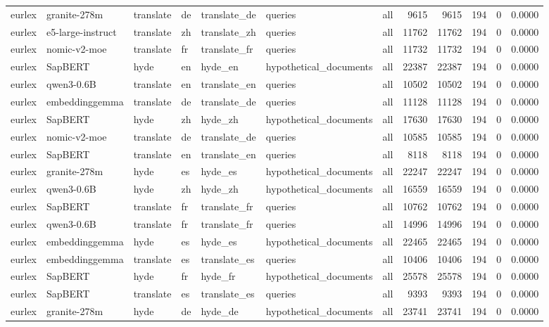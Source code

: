 \begin{tabular}{lllllllrrrrr}
eurlex & granite-278m & translate & de & translate\_de & queries & all & 9615 & 9615 & 194 & 0 & 0.0000 \\
eurlex & e5-large-instruct & translate & zh & translate\_zh & queries & all & 11762 & 11762 & 194 & 0 & 0.0000 \\
eurlex & nomic-v2-moe & translate & fr & translate\_fr & queries & all & 11732 & 11732 & 194 & 0 & 0.0000 \\
eurlex & SapBERT & hyde & en & hyde\_en & hypothetical\_documents & all & 22387 & 22387 & 194 & 0 & 0.0000 \\
eurlex & qwen3-0.6B & translate & en & translate\_en & queries & all & 10502 & 10502 & 194 & 0 & 0.0000 \\
eurlex & embeddinggemma & translate & de & translate\_de & queries & all & 11128 & 11128 & 194 & 0 & 0.0000 \\
eurlex & SapBERT & hyde & zh & hyde\_zh & hypothetical\_documents & all & 17630 & 17630 & 194 & 0 & 0.0000 \\
eurlex & nomic-v2-moe & translate & de & translate\_de & queries & all & 10585 & 10585 & 194 & 0 & 0.0000 \\
eurlex & SapBERT & translate & en & translate\_en & queries & all & 8118 & 8118 & 194 & 0 & 0.0000 \\
eurlex & granite-278m & hyde & es & hyde\_es & hypothetical\_documents & all & 22247 & 22247 & 194 & 0 & 0.0000 \\
eurlex & qwen3-0.6B & hyde & zh & hyde\_zh & hypothetical\_documents & all & 16559 & 16559 & 194 & 0 & 0.0000 \\
eurlex & SapBERT & translate & fr & translate\_fr & queries & all & 10762 & 10762 & 194 & 0 & 0.0000 \\
eurlex & qwen3-0.6B & translate & fr & translate\_fr & queries & all & 14996 & 14996 & 194 & 0 & 0.0000 \\
eurlex & embeddinggemma & hyde & es & hyde\_es & hypothetical\_documents & all & 22465 & 22465 & 194 & 0 & 0.0000 \\
eurlex & embeddinggemma & translate & es & translate\_es & queries & all & 10406 & 10406 & 194 & 0 & 0.0000 \\
eurlex & SapBERT & hyde & fr & hyde\_fr & hypothetical\_documents & all & 25578 & 25578 & 194 & 0 & 0.0000 \\
eurlex & SapBERT & translate & es & translate\_es & queries & all & 9393 & 9393 & 194 & 0 & 0.0000 \\
eurlex & granite-278m & hyde & de & hyde\_de & hypothetical\_documents & all & 23741 & 23741 & 194 & 0 & 0.0000 \\

\end{tabular}
